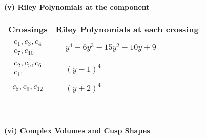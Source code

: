 \documentclass[1p]{elsarticle_modified}
\theoremstyle{definition}
\begin{document}
\newpage\renewcommand{\arraystretch}{1}
\flushleft \textbf{(v) Riley Polynomials at the component}\newline \\
\begin{tabular}{m{50pt}|m{274pt}}
Crossings & \hspace{64pt}Riley Polynomials at each crossing \\
\hline $$\begin{aligned}c_{1},c_{3},c_{4}\\c_{7},c_{10}\end{aligned}$$&$\begin{aligned}
&y^4-6 y^3+15 y^2-10 y+9
\end{aligned}$\\
\hline $$\begin{aligned}c_{2},c_{5},c_{6}\\c_{11}\end{aligned}$$&$\begin{aligned}
&(y-1)^4
\end{aligned}$\\
\hline $$\begin{aligned}c_{8},c_{9},c_{12}\end{aligned}$$&$\begin{aligned}
&(y+2)^4
\end{aligned}$\\
\hline
\end{tabular}\\~\\
\newpage\flushleft \textbf{(vi) Complex Volumes and Cusp Shapes}
\end{document}

